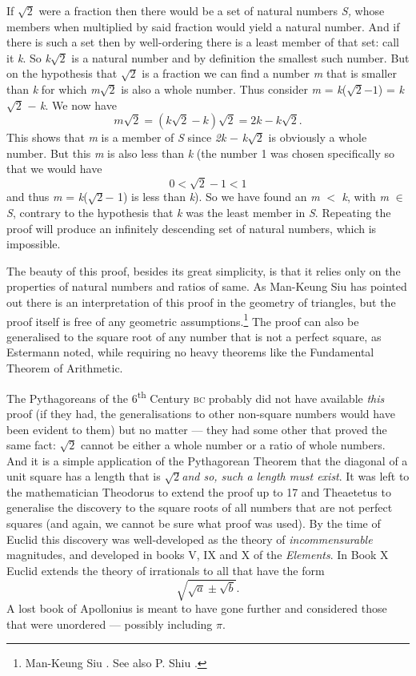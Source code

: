 \documentclass[11pt,oneside,a4paper]{article}
\newcommand*{\sqrtwo}{\ensuremath{\sqrt{2}}\hspace{0.5ex}\xspace}
\newcommand*{\thing}[1]{\hspace{0.75pt}\textit{#1}\hspace{1.5pt}\xspace}
\newcommand{\ksqrtwo}[1]{\hspace{0.4ex}\textit{#1}\ensuremath{\sqrt{2}}\hspace{0.5ex}\xspace}
\begin{document}
If \sqrtwo were a fraction then there would be a set of natural numbers \thing{S,} whose members when multiplied by said fraction would yield a natural number. And if there is such a set then by well-ordering there is a least member of that set: call it \thing{k}. So \ksqrtwo{k} is a natural number and by definition the smallest such number. But on the hypothesis that \sqrtwo is a fraction we can find a number \thing{m} that is smaller than \thing{k} for which \ksqrtwo{m} is also a whole number. Thus consider \thing{m} = \thing{k}(\sqrtwo $- 1$) = \ksqrtwo{k} $-$ \thing{k}. We now have $$m\sqrt{2} = (k\sqrt{2} - k)\sqrt{2} = 2k - k\sqrt{2}.$$ This shows that \thing{m} is a member of \thing{S} since \thing{2k} $-$ \ksqrtwo{k} is obviously a whole number. But this \thing{m} is also less than \thing{k}  (the number 1 was chosen specifically so that we would have$$0 < \sqrt{2} - 1 < 1$$ and thus \thing{m} = \thing{k}(\sqrtwo $-$ 1) is less than \thing{k}). So we have found an \thing{m} $<$ \thing{k}, with \thing{m} $\in$ \thing{S}, contrary to the hypothesis that \thing{k} was the least member in \thing{S}. Repeating the proof will produce an infinitely descending set of natural numbers, which is impossible.

The beauty of this proof, besides its great simplicity, is that it relies only on the properties of natural numbers and ratios of same. As Man-Keung Siu has pointed out there is an interpretation of this proof in the geometry of triangles, but the proof itself is free of any geometric assumptions.\footnote{Man-Keung Siu \parencite*{siu_estermann_1998}. See also P. Shiu \parencite*{shiu_more_1999}.} The proof can also be generalised to the square root of any number that is not a perfect square, as Estermann noted, while requiring no heavy theorems like the Fundamental Theorem of Arithmetic.

The Pythagoreans of the 6\textsuperscript{th} Century \textsc{bc} probably did not have available \textit{this} proof (if they had, the generalisations to other non-square numbers would have been evident to them) but no matter --- they had some other that proved the same fact: \sqrtwo cannot be either a whole number or a ratio of whole numbers. And it is a simple application of the Pythagorean Theorem that the diagonal of a unit square has a length that is \sqrtwo \emph{and so, such a length \emph{must} exist}. It was left to the mathematician Theodorus to extend the proof up to 17 and Theaetetus to generalise the discovery to the square roots of all numbers that are not perfect squares (and again, we cannot be sure what proof was used). By the time of Euclid this discovery was well-developed as the theory of \textit{incommensurable} magnitudes, and developed in books V, IX and X of the \textit{Elements}. In Book X Euclid extends the theory of irrationals to all that have the form $$\sqrt{\sqrt{a} \pm \sqrt{b}}.$$ A lost book of Apollonius is meant to have gone further and considered those that were unordered --- possibly including $\pi$.
\end{document}
